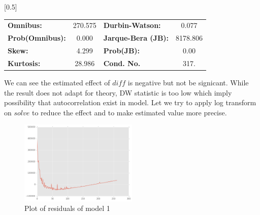 \documentclass{beamer}
\begin{document}
\begin{frame}
\begin{center}
{\begin{tabular}{lccccc}
\bottomrule
\end{tabular}
}
\scalebox{0.5}[0.5]{
\begin{tabular}{lclc}
\toprule
\textbf{Omnibus:}       & 270.575 & \textbf{  Durbin-Watson:     } &    0.077  \\
\textbf{Prob(Omnibus):} &   0.000 & \textbf{  Jarque-Bera (JB):  } & 8178.806  \\
\textbf{Skew:}          &   4.299 & \textbf{  Prob(JB):          } &     0.00  \\
\textbf{Kurtosis:}      &  28.986 & \textbf{  Cond. No.          } &     317.  \\
\bottomrule
\end{tabular}
}
\end{center}

\end{frame}

\begin{frame}

We can see the estimated effect of $diff$ is negative but not be signicant. 
While the result does not adapt for theory,
DW statistic is too low which imply possibility that autocorrelation exist in model. 
Let we try to apply log transform on $solve$ to reduce the effect and to make estimated value more precise.

\begin{figure}[h]
\includegraphics[width=0.5\textwidth, inner]{model1-resid.png}
\caption{Plot of residuals of model 1}
\label{fig:f3}
\end{figure}

\end{frame}
\end{document}
